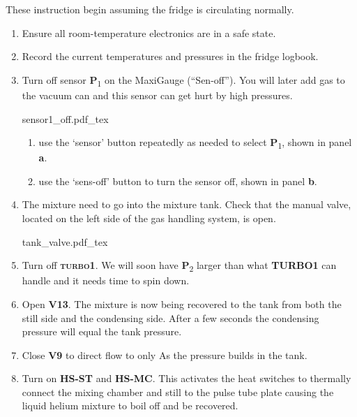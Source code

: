 \documentclass{article}[18pt,A4]
\newcommand{\thing}[1]{{\color{gray}\textsc{ \textbf{#1}}}}
\newcommand{\valve}[1]{{\color{gray}\textbf{V#1}}}
\newcommand{\pressure}[1]{{\color{pressurecolor}\textbf{P}\textsubscript{#1}}}
\begin{document}
These instruction begin assuming the fridge is circulating normally.

\begin{enumerate}
    \item Ensure all room-temperature electronics are in a safe state.  
    \item Record the current temperatures and pressures in the fridge logbook.
    \item Turn off sensor \pressure{1} on the MaxiGauge (``Sen-off''). 
    You will later add gas to the vacuum can and this sensor can get hurt by high pressures. 
    
    {
    \centering
    {sensor1_off.pdf_tex}
    }
        \begin{enumerate}
            \item use the `sensor' button repeatedly as needed to select \pressure{1}, shown in panel \textbf{a}.
            \item use the `sens-off' button to turn the sensor off, shown in panel \textbf{b}. 
        \end{enumerate}
        
    \item The mixture need to go into the mixture tank. Check that the manual valve, located on the left side of the gas handling system, is open. 
    
    {
    \centering
    {tank_valve.pdf_tex}
    }
    
    \item Turn off \thing{turbo1}. We will soon have \pressure{2} larger than what \thing{TURBO1} can handle and it needs time to spin down.
    
    \item Open \valve{13}. The mixture is now being recovered to the tank from both the still side and the condensing side.
    After a few seconds the condensing pressure will equal the tank pressure.
    \item Close \valve{9} to direct flow to only As the pressure builds in the tank.
    \item Turn on \thing{HS-ST} and \thing{HS-MC}.
    This activates the heat switches to thermally connect the mixing chamber and still to the pulse tube plate causing the liquid helium mixture
    to boil off and be recovered.
    

\end{enumerate}
\end{document}
